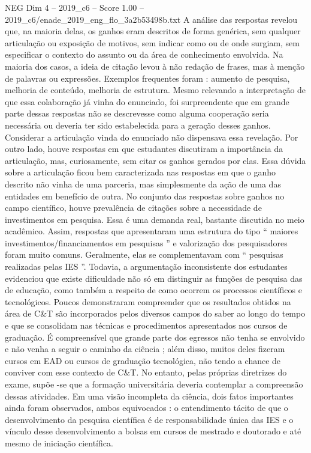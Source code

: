 \begin{textsample}{NEG Dim 4 – 2019\_c6 – Score 1.00 – 2019\_c6/enade\_2019\_eng\_flo\_3a2b53498b.txt}
A análise das respostas revelou que, na maioria delas, os ganhos eram descritos de forma genérica, sem qualquer articulação ou exposição de motivos, sem indicar como ou de onde surgiam, sem especificar o contexto do assunto ou da área de conhecimento envolvida.
Na maioria dos casos, a ideia de citação levou à não redação de frases, mas à menção de palavras ou expressões.
Exemplos frequentes foram : aumento de pesquisa, melhoria de conteúdo, melhoria de estrutura.
Mesmo relevando a interpretação de que essa colaboração já vinha do enunciado, foi surpreendente que em grande parte dessas respostas não se descrevesse como alguma cooperação seria necessária ou deveria ter sido estabelecida para a geração desses ganhos.
Considerar a articulação vinda do enunciado não dispensava essa revelação.
Por outro lado, houve respostas em que estudantes discutiram a importância da articulação, mas, curiosamente, sem citar os ganhos gerados por elas.
Essa dúvida sobre a articulação ficou bem caracterizada nas respostas em que o ganho descrito não vinha de uma parceria, mas simplesmente da ação de uma das entidades em benefício de outra.
No conjunto das respostas sobre ganhos no campo científico, houve prevalência de citações sobre a necessidade de investimentos em pesquisa.
Essa é uma demanda real, bastante discutida no meio acadêmico.
Assim, respostas que apresentaram uma estrutura do tipo “ maiores investimentos/financiamentos em pesquisas ” e valorização dos pesquisadores foram muito comuns.
Geralmente, elas se complementavam com “ pesquisas realizadas pelas IES ”.
Todavia, a argumentação inconsistente dos estudantes evidenciou que existe dificuldade não só em distinguir as funções de pesquisa das de educação, como também a respeito de como ocorrem os processos científicos e tecnológicos.
Poucos demonstraram compreender que os resultados obtidos na área de C\&T são incorporados pelos diversos campos do saber ao longo do tempo e que se consolidam nas técnicas e procedimentos apresentados nos cursos de graduação.
É compreensível que grande parte dos egressos não tenha se envolvido e não venha a seguir o caminho da ciência ; além disso, muitos deles fizeram cursos em EAD ou cursos de graduação tecnológica, não tendo a chance de conviver com esse contexto de C\&T.
No entanto, pelas próprias diretrizes do exame, supõe -se que a formação universitária deveria contemplar a compreensão dessas atividades.
Em uma visão incompleta da ciência, dois fatos importantes ainda foram observados, ambos equivocados : o entendimento tácito de que o desenvolvimento da pesquisa científica é de responsabilidade única das IES e o vínculo desse desenvolvimento a bolsas em cursos de mestrado e doutorado e até mesmo de iniciação científica.

\end{textsample}
